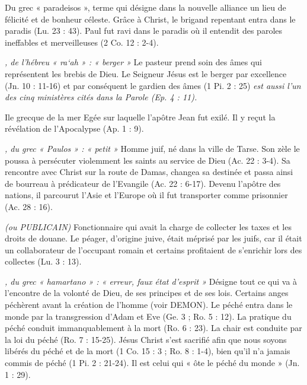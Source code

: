 \begin{multicols}{2}
\textit{}\newline
Du grec « paradeisos », terme qui désigne dans la nouvelle alliance un lieu de félicité et de bonheur céleste. Grâce à Christ, le brigand repentant entra dans le paradis (Lu. 23 : 43). Paul fut ravi dans le paradis où il entendit des paroles ineffables et merveilleuses (2 Co. 12 : 2-4).

\textit{, de l'hébreu « ra`ah » : « berger »}\newline
Le pasteur prend soin des âmes qui représentent les brebis de Dieu.
Le Seigneur Jésus est le berger par excellence (Jn. 10 : 11-16) et par conséquent le gardien des âmes (1 Pi. 2 : 25)
\textit{est aussi l'un des cinq ministères cités dans la Parole (Ep. 4 : 11).}\newline

\textit{}\newline
Ile grecque de la mer Egée sur laquelle l'apôtre Jean fut exilé. Il y reçut la révélation de l'Apocalypse (Ap. 1 : 9).

\textit{, du grec « Paulos » : « petit »}\newline
Homme juif, né dans la ville de Tarse. Son zèle le poussa à persécuter violemment les saints au service de Dieu (Ac. 22 : 3-4). Sa rencontre avec Christ sur la route de Damas, changea sa destinée et passa ainsi de bourreau à prédicateur de l'Evangile (Ac. 22 : 6-17).
Devenu l'apôtre des nations, il parcourut l'Asie et l'Europe où il fut transporter comme prisonnier (Ac. 28 : 16).

\textit{}\newline

\textit{(ou PUBLICAIN)}\newline
Fonctionnaire qui avait la charge de collecter les taxes et les droits de douane. Le péager, d'origine juive, était méprisé par les juifs, car il était un collaborateur de l'occupant romain et certains profitaient de s'enrichir lors des collectes (Lu. 3 : 13).

\textit{, du grec « hamartano » : « erreur, faux état d'esprit »}\newline
Désigne tout ce qui va à l'encontre de la volonté de Dieu, de ses principes et de ses lois. Certains anges péchèrent avant la création de l'homme (voir DEMON). Le péché entra dans le monde par la transgression d'Adam et Eve (Ge. 3 ; Ro. 5 : 12). La pratique du péché conduit immanquablement à la mort (Ro. 6 : 23). La chair est conduite par la loi du péché (Ro. 7 : 15-25).
Jésus Christ s'est sacrifié afin que nous soyons libérés du péché et de la mort (1 Co. 15 : 3 ; Ro. 8 : 1-4), bien qu'il n'a jamais commis de péché (1 Pi. 2 : 21-24). Il est celui qui « ôte le péché du monde » (Jn. 1 : 29).


\end{multicols}
